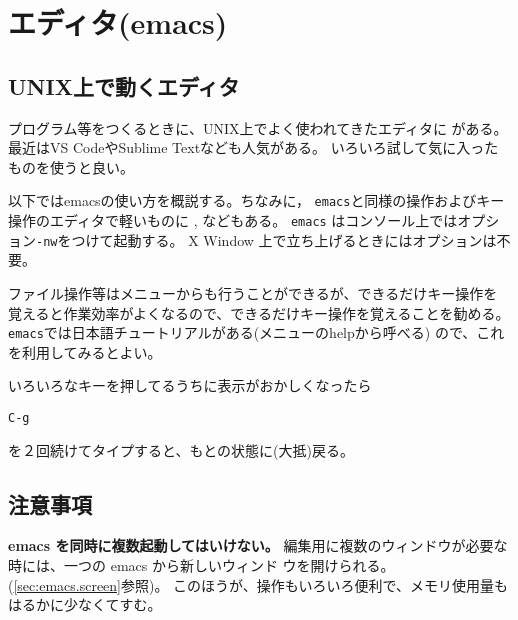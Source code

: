 \documentclass{jreport}
\begin{document}




\chapter{エディタ(emacs)}

\section{UNIX上で動くエディタ}
プログラム等をつくるときに、UNIX上でよく使われてきたエディタに
がある。
最近はVS CodeやSublime Textなども人気がある。
いろいろ試して気に入ったものを使うと良い。

以下ではemacsの使い方を概説する。ちなみに，
\verb|emacs|と同様の操作およびキー操作のエディタで軽いものに
, などもある。
\verb|emacs| はコンソール上ではオプション\verb|-nw|をつけて起動する。
X Window 上で立ち上げるときにはオプションは不要。

ファイル操作等はメニューからも行うことができるが、できるだけキー操作を
覚えると作業効率がよくなるので、できるだけキー操作を覚えることを勧める。
\verb|emacs|では日本語チュートリアルがある(メニューのhelpから呼べる)
ので、これを利用してみるとよい。

いろいろなキーを押してるうちに表示がおかしくなったら
\begin{screen}
\begin{verbatim}
C-g
\end{verbatim}
\end{screen}
を２回続けてタイプすると、もとの状態に(大抵)戻る。

\section{注意事項}

\textbf{emacs を同時に複数起動してはいけない。}
編集用に複数のウィンドウが必要な時には、一つの emacs から新しいウィンド
ウを開けられる。
(\ref{sec:emacs.screen}参照)。
このほうが、操作もいろいろ便利で、メモリ使用量もはるかに少なくてすむ。
\end{document}

